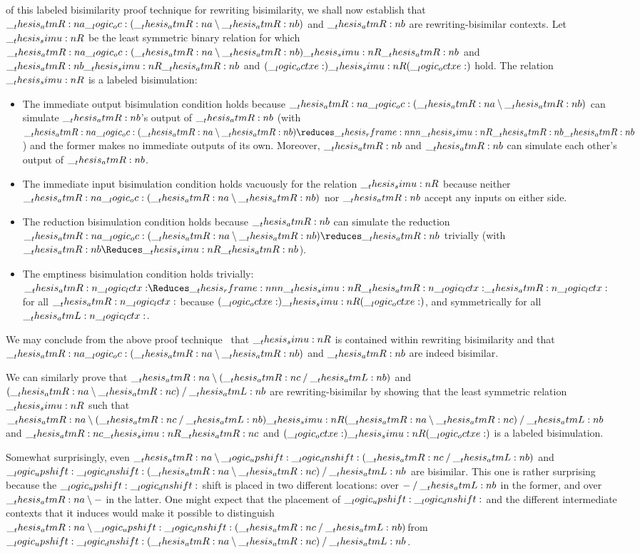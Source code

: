  of this labeled bisimilarity proof technique for rewriting bisimilarity, we shall now establish that $\atmR{a} \oc (\atmR{a} \limp \atmR{b})$ and $\atmR{b}$ are rewriting-bisimilar contexts.
Let $\simu{R}$ be the least symmetric binary relation for which $\atmR{a} \oc (\atmR{a} \limp \atmR{b}) \simu{R} \atmR{b}$ and $\atmR{b} \simu{R} \atmR{b}$ and $(\octxe) \simu{R} (\octxe)$ hold.
The relation $\simu{R}$ is a labeled bisimulation:
\begin{itemize}
\item The immediate output bisimulation condition holds because $\atmR{a} \oc (\atmR{a} \limp \atmR{b})$ can simulate $\atmR{b}$'s output of $\atmR{b}$ (with $\atmR{a} \oc (\atmR{a} \limp \atmR{b}) \reduces\rframe{\simu{R}}{\atmR{b}} \atmR{b}$) and the former makes no immediate outputs of its own.
  Moreover, $\atmR{b}$ and $\atmR{b}$ can simulate each other's output of $\atmR{b}$.
\item The immediate input bisimulation condition holds vacuously for the relation $\simu{R}$ because neither $\atmR{a} \oc (\atmR{a} \limp \atmR{b})$ nor $\atmR{b}$ accept any inputs on either side.
\item The reduction bisimulation condition holds because $\atmR{b}$ can simulate the reduction $\atmR{a} \oc (\atmR{a} \limp \atmR{b}) \reduces \atmR{b}$ trivially (with $\atmR{b} \Reduces\simu{R} \atmR{b}$).
\item The emptiness bisimulation condition holds trivially: $\atmR{\lctx} \Reduces\rframe{\simu{R}}{\atmR{\lctx}} \atmR{\lctx}$ for all $\atmR{\lctx}$ because $(\octxe) \simu{R} (\octxe)$, and symmetrically for all $\atmL{\lctx}$.
\end{itemize}
We may conclude from the above proof technique~ that $\simu{R}$ is contained within rewriting bisimilarity and that $\atmR{a} \oc (\atmR{a} \limp \atmR{b})$ and $\atmR{b}$ are indeed bisimilar.

We can similarly prove that $\atmR{a} \limp (\atmR{c} \pmir \atmL{b})$ and $(\atmR{a} \limp \atmR{c}) \pmir \atmL{b}$ are rewriting-bisimilar by showing that the least symmetric relation $\simu{R}$ such that $\atmR{a} \limp (\atmR{c} \pmir \atmL{b}) \simu{R} (\atmR{a} \limp \atmR{c}) \pmir \atmL{b}$ and $\atmR{c} \simu{R} \atmR{c}$ and $(\octxe) \simu{R} (\octxe)$ is a labeled bisimulation.

Somewhat surprisingly, even $\atmR{a} \limp \up \dn (\atmR{c} \pmir \atmL{b})$ and $\up \dn (\atmR{a} \limp \atmR{c}) \pmir \atmL{b}$ are bisimilar.
This one is rather surprising because the $\up \dn$ shift is placed in two different locations: over $\mathord{-} \pmir \atmL{b}$ in the former, and over $\atmR{a} \limp \mathord{-}$ in the latter.
One might expect that the placement of $\up \dn$ and the different intermediate contexts that it induces would make it possible to distinguish $\atmR{a} \limp \up \dn (\atmR{c} \pmir \atmL{b})$from $\up \dn (\atmR{a} \limp \atmR{c}) \pmir \atmL{b}$.

